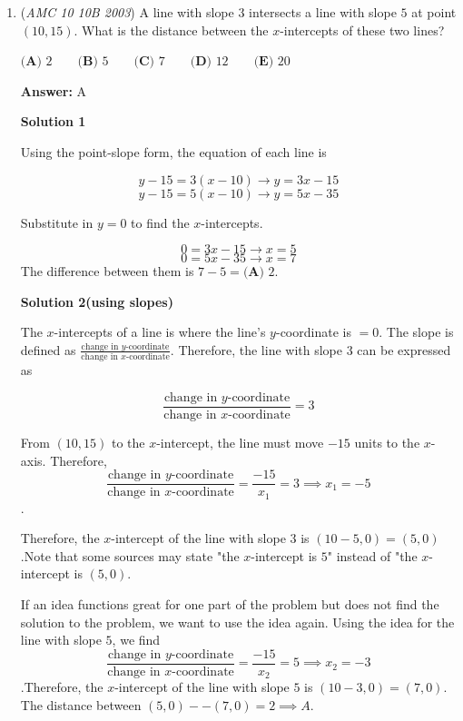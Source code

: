 \begin{enumerate}
	\item (\textit{AMC 10 10B 2003}) A line with slope $3$ intersects a line with slope $5$ at point  $(10,15)$. What is the distance between the $x$-intercepts of these two lines?


 $\textbf{(A) } 2 \qquad\textbf{(B) } 5 \qquad\textbf{(C) } 7 \qquad\textbf{(D) } 12 \qquad\textbf{(E) } 20$

 \textbf{Answer: }A



\textbf{Solution 1}

Using the point-slope form, the equation of each line is

 
 \[y-15=3(x-10) \longrightarrow y=3x-15\]
 \[y-15=5(x-10) \longrightarrow y=5x-35\]

 Substitute in $y=0$ to find the $x$-intercepts.

 
 \[0=3x-15\longrightarrow x=5\]
 \[0=5x-35\longrightarrow x=7\]The difference between them is $7-5=\boxed{\textbf{(A) \ } 2}$.

 



\textbf{Solution 2(using slopes)}

The $x$-intercepts of a line is where the line's $y$-coordinate is $=0$. The slope is defined as $\frac{\text{change in } y\text{-coordinate}}{\text{change in } x\text{-coordinate}}$. Therefore, the line with slope $3$ can be expressed as

 
 \[\frac{\text{change in }y\text{-coordinate}}{\text{change in }x\text{-coordinate}}=3\]

 From $(10,15)$ to the $x$-intercept, the line must move $-15$ units to the $x$-axis. Therefore, 
 \[\frac{\text{change in }y\text{-coordinate}}{\text{change in }x\text{-coordinate}}=\frac{-15}{x_1}=3\implies x_1=-5\].

 Therefore, the $x$-intercept of the line with slope $3$ is $(10-5,0)=(5,0)$.Note that some sources may state "the $x$-intercept is $5$" instead of "the $x$-intercept is $(5,0)$.

 If an idea functions great for one part of the problem but does not find the solution to the problem, we want to use the idea again. Using the idea for the line with slope $5$, we find
 \[\frac{\text{change in }y\text{-coordinate}}{\text{change in }x\text{-coordinate}}=\frac{-15}{x_2}=5\implies x_2=-3\].Therefore, the $x$-intercept of the line with slope $5$ is $(10-3,0)=(7,0)$. The distance between $\boxed{(5,0)--(7,0)=2\implies A}$.

 



\end{enumerate}
